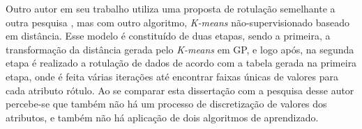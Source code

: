 Outro autor \cite{imperes2018} em seu trabalho  utiliza uma proposta de rotulação semelhante a outra pesquisa \cite{Filho2015}, mas com outro algoritmo, \textit{K-means} não-supervisionado baseado em distância. Esse modelo é constituído de duas etapas, sendo a primeira, a transformação da distância gerada pelo \textit{K-means} em GP, e logo após, na segunda etapa é realizado a rotulação de dados de acordo com a tabela gerada na primeira etapa, onde é feita várias iterações até encontrar faixas únicas de valores para cada atributo rótulo. Ao se comparar esta dissertação com a pesquisa desse autor \cite{imperes2018} percebe-se que também não há um processo de discretização de valores dos atributos, e também não há aplicação de dois algoritmos de aprendizado.


